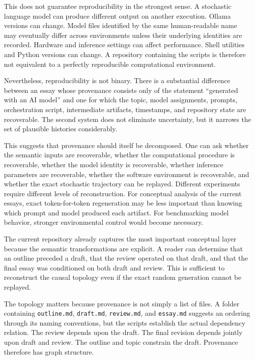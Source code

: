 \documentclass[11pt]{article}
\begin{document}
This does not guarantee reproducibility in the strongest sense. A stochastic language model can produce different output on another execution. Ollama versions can change. Model files identified by the same human-readable name may eventually differ across environments unless their underlying identities are recorded. Hardware and inference settings can affect performance. Shell utilities and Python versions can change. A repository containing the scripts is therefore not equivalent to a perfectly reproducible computational environment.

Nevertheless, reproducibility is not binary. There is a substantial difference between an essay whose provenance consists only of the statement ``generated with an AI model'' and one for which the topic, model assignments, prompts, orchestration script, intermediate artifacts, timestamps, and repository state are recoverable. The second system does not eliminate uncertainty, but it narrows the set of plausible histories considerably.

This suggests that provenance should itself be decomposed. One can ask whether the semantic inputs are recoverable, whether the computational procedure is recoverable, whether the model identity is recoverable, whether inference parameters are recoverable, whether the software environment is recoverable, and whether the exact stochastic trajectory can be replayed. Different experiments require different levels of reconstruction. For conceptual analysis of the current essays, exact token-for-token regeneration may be less important than knowing which prompt and model produced each artifact. For benchmarking model behavior, stronger environmental control would become necessary.

The current repository already captures the most important conceptual layer because the semantic transformations are explicit. A reader can determine that an outline preceded a draft, that the review operated on that draft, and that the final essay was conditioned on both draft and review. This is sufficient to reconstruct the causal topology even if the exact random generation cannot be replayed.

The topology matters because provenance is not simply a list of files. A folder containing \texttt{outline.md}, \texttt{draft.md}, \texttt{review.md}, and \texttt{essay.md} suggests an ordering through its naming conventions, but the scripts establish the actual dependency relation. The review depends upon the draft. The final revision depends jointly upon draft and review. The outline and topic constrain the draft. Provenance therefore has graph structure.
\end{document}
